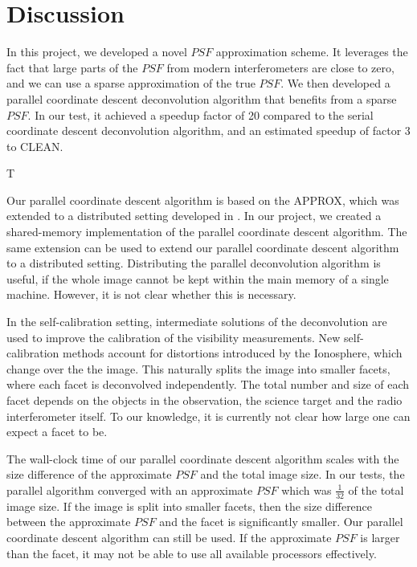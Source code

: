 \section{Discussion}\label{discussion}
In this project, we developed a novel $PSF$ approximation scheme. It leverages the fact that large parts of the $PSF$ from modern interferometers are close to zero, and we can use a sparse approximation of the true $PSF$. We then developed a parallel coordinate descent deconvolution algorithm that benefits from a sparse $PSF$. In our test, it achieved a speedup factor of 20 compared to the serial coordinate descent deconvolution algorithm, and an estimated speedup of factor 3 to CLEAN.

T

Our parallel coordinate descent algorithm is based on the APPROX\cite{fercoq2015accelerated}, which was extended to a distributed setting developed in \cite{fercoqfast}. In our project, we created a shared-memory implementation of the parallel coordinate descent algorithm. The same extension can be used to extend our parallel coordinate descent algorithm to a distributed setting. Distributing the parallel deconvolution algorithm is useful, if the whole image cannot be kept within the main memory of a single machine. However, it is not clear whether this is necessary.

In the self-calibration setting, intermediate solutions of the deconvolution are used to improve the calibration of the visibility measurements. New self-calibration methods account for distortions introduced by the Ionosphere, which change over the the image. This naturally splits the image into smaller facets, where each facet is deconvolved independently\cite{van2016lofar}. The total number and size of each facet depends on the objects in the observation, the science target and the radio interferometer itself. To our knowledge, it is currently not clear how large one can expect a facet to be.

The wall-clock time of our parallel coordinate descent algorithm scales with the size difference of the approximate $PSF$ and the total image size. In our tests, the parallel algorithm converged with an approximate $PSF$ which was $\frac{1}{32}$ of the total image size. If the image is split into smaller facets, then the size difference between the approximate $PSF$ and the facet is significantly smaller. Our parallel coordinate descent algorithm can still be used. If the approximate $PSF$ is larger than the facet, it may not be able to use all available processors effectively.

